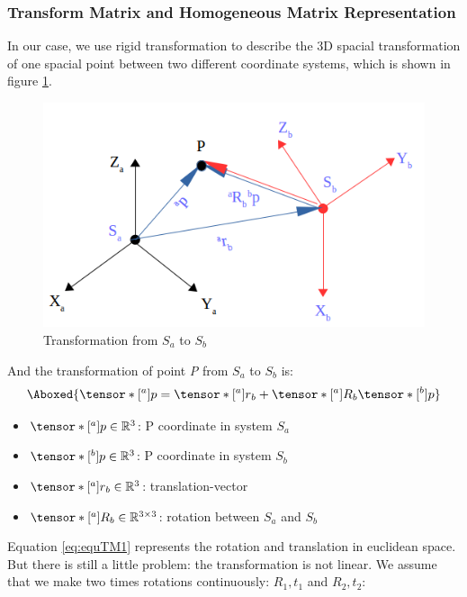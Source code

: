 \subsubsection{Transform Matrix and Homogeneous Matrix Representation}
In our case, we use rigid transformation to describe the 3D spacial transformation of one spacial point between two different coordinate systems, which is shown in figure \ref{fig:rt}.

\begin{figure}[h]
\centering
\includegraphics[scale=0.5]{./fig/rt.png}
\caption{Transformation from $S_a$ to $S_b$}
\label{fig:rt}
\end{figure}

And the transformation of point \textit{P} from $S_a$ to $S_b$ is:
\begin{align}\label{eq:equTM1}
\Aboxed{ \tensor*[^a]{p}{} = \tensor*[^a]{r}{_b} + \tensor*[^a]{R}{_b}\tensor*[^b]{p}{}}
\end{align}

\begin{itemize}
\item $\tensor*[^a]{p}{} \in \mathbb{R}^{3}$: P coordinate in system $S_a$
\item $\tensor*[^b]{p}{} \in \mathbb{R}^{3}$: P coordinate in system $S_b$
\item $\tensor*[^a]{r}{_b} \in \mathbb{R}^{3}$: translation-vector
\item $\tensor*[^a]{R}{_b} \in \mathbb{R}^{3\times3}$: rotation between $S_a$ and $S_b$
\end{itemize}

Equation \ref{eq:equTM1} represents the rotation and translation in euclidean space. But there is still a little problem: the transformation is not linear. We assume that we make two times rotations continuously: $R_1, t_1$ and $R_2, t_2$:


